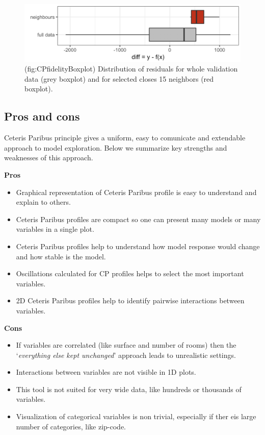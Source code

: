 \documentclass[]{krantz}
\providecommand{\tightlist}{%
  \setlength{\itemsep}{0pt}\setlength{\parskip}{0pt}}
\theoremstyle{definition}
\theoremstyle{definition}
\theoremstyle{definition}
\theoremstyle{remark}
\begin{document}
\begin{figure}

{\centering \includegraphics[width=0.7\linewidth]{figure/cp_fidelity_boxplot} 

}

\caption{(fig:CPfidelityBoxplot) Distribution of residuals for whole validation data (grey boxplot) and for selected closes 15 neighbors (red boxplot).}\label{fig:CPfidelityBoxplot}
\end{figure}

\hypertarget{pros-and-cons}{%
\subsection{Pros and cons}\label{pros-and-cons}}

Ceteris Paribus principle gives a uniform, easy to comunicate and
extendable approach to model exploration. Below we summarize key
strengths and weaknesses of this approach.

\textbf{Pros}

\begin{itemize}
\tightlist
\item
  Graphical representation of Ceteris Paribus profile is easy to
  understand and explain to others.
\item
  Ceteris Paribus profiles are compact so one can present many models or
  many variables in a single plot.
\item
  Ceteris Paribus profiles help to understand how model response would
  change and how stable is the model.
\item
  Oscillations calculated for CP profiles helps to select the most
  important variables.
\item
  2D Ceteris Paribus profiles help to identify pairwise interactions
  between variables.
\end{itemize}

\textbf{Cons}

\begin{itemize}
\tightlist
\item
  If variables are correlated (like surface and number of rooms) then
  the `\emph{everything else kept unchanged}' approach leads to
  unrealistic settings.
\item
  Interactions between variables are not visible in 1D plots.
\item
  This tool is not suited for very wide data, like hundreds or thousands
  of variables.
\item
  Visualization of categorical variables is non trivial, especially if
  ther eis large number of categories, like zip-code.
\end{itemize}
\end{document}
